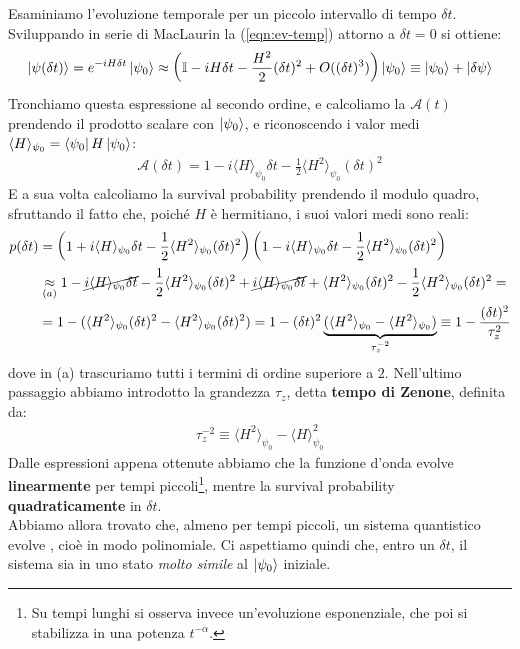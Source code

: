 \documentclass[../../InformazioneQuantistica.tex]{subfiles}
\begin{document}
Esaminiamo l'evoluzione temporale per un piccolo intervallo di tempo $\delta t$. Sviluppando in serie di MacLaurin la (\ref{eqn:ev-temp}) attorno a $\delta t=0$ si ottiene:
\begin{align*}
\Ket{\psi(\delta t)} = e^{-iH\delta t} \Ket{\psi_0} \approx \left(\mathbb{I} - iH\delta t -\frac{H^2}{2} (\delta t)^2 + O((\delta t)^3) \right) \Ket{\psi_0} \equiv \Ket{\psi_0} + \Ket{\delta \psi}
\end{align*}
Tronchiamo questa espressione al secondo ordine, e calcoliamo la  $\mathcal{A}(t)$ prendendo il prodotto scalare con $\Ket{\psi_0}$, e riconoscendo i valor medi $\langle H \rangle_{\psi_0}=\Bra{\psi_0}H\Ket{\psi_0}$:
\begin{align*}
\mathcal{A}(\delta t) = 1 - i\langle H \rangle_{\psi_0} \delta t- \frac{1}{2}\langle H^2 \rangle_{\psi_0} (\delta t)^2
\end{align*}
E a sua volta calcoliamo la survival probability prendendo il modulo quadro, sfruttando il fatto che, poiché $H$ è hermitiano, i suoi valori medi sono reali:
\begin{align}\nonumber
p(\delta t) &= \left(1 + i\langle H \rangle_{\psi_0} \delta t- \frac{1}{2}\langle H^2\rangle_{\psi_0} (\delta t)^2 \right) \left(1-i\langle H \rangle_{\psi_0}\delta t - \frac{1}{2}\langle H^2\rangle_{\psi_0}(\delta t)^2\right) \\ \nonumber
&\underset{(a)}{\approx} 1 - \cancel{i\langle H \rangle_{\psi_0} \delta t}- \frac{1}{2}\langle H^2\rangle_{\psi_0} (\delta t)^2 + \cancel{i\langle H \rangle_{\psi_0} \delta t} + \langle H^2\rangle_{\psi_0} (\delta t)^2 - \frac{1}{2}\langle H^2\rangle_{\psi_0} (\delta t)^2=\\
&= 1-(\langle H^2\rangle_{\psi_0} (\delta t)^2 - \langle H^2\rangle_{\psi_0}(\delta t)^2)
= 1-(\delta t)^2 \underbrace{(\langle H^2\rangle_{\psi_0}-\langle H^2\rangle_{\psi_0})}_{\tau_z^{-2}} \equiv 1-\frac{(\delta t)^2}{\tau^2_z} 
\label{eqn:p-tau}
\end{align}
dove in (a) trascuriamo tutti i termini di ordine superiore a $2$. Nell'ultimo passaggio abbiamo introdotto la grandezza $\tau_z$, detta \textbf{tempo di Zenone}, definita da:
\begin{align}
\tau_z^{-2} \equiv \langle H^2\rangle_{\psi_0} - \langle H \rangle_{\psi_0}^2
\label{eqn:zeno-time}
\end{align}
Dalle espressioni appena ottenute abbiamo che la funzione d'onda evolve \textbf{linearmente} per tempi piccoli\footnote{Su tempi lunghi si osserva invece un'evoluzione esponenziale, che poi si stabilizza in una potenza $t^{-\alpha}$.}, mentre la survival probability \textbf{quadraticamente} in $\delta t$.\\
Abbiamo allora trovato che, almeno per tempi piccoli, un sistema quantistico evolve , cioè in modo polinomiale. Ci aspettiamo quindi che, entro un $\delta t$, il sistema sia in uno stato \textit{molto simile} al $\Ket{\psi_0}$ iniziale.\\
\end{document}
